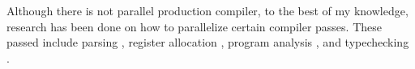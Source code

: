 \documentclass[10pt]{article}
\begin{document}





Although there is not parallel production compiler, to the best of my knowledge, research
has been done on how to parallelize certain compiler passes.  These passed include
parsing \cite{}, register allocation \cite{}, program analysis \cite{}, and typechecking \cite{}.


\end{document}

